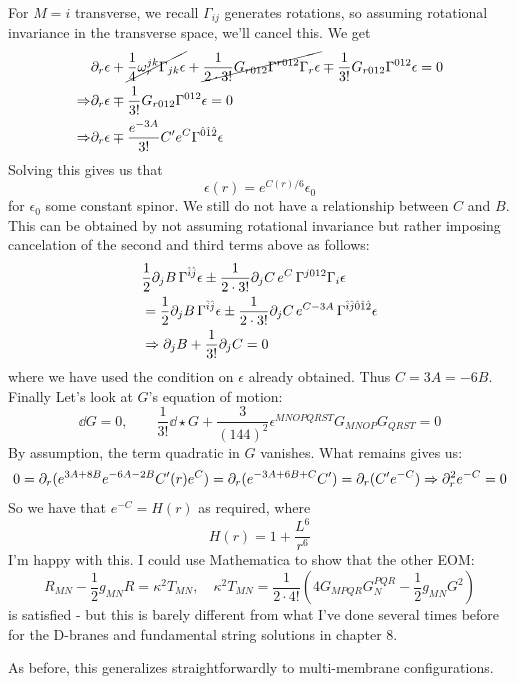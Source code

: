 \documentclass[11pt, class=article, crop=false]{standalone}
\begin{document}
\begin{enumerate}
	For $M = i$ transverse, we recall $\Gamma_{ij}$ generates rotations, so assuming rotational invariance in the transverse space, we'll cancel this. We get
	\[
	\begin{aligned}
		&\partial_r \epsilon + \cancel{\frac14 \omega_{r}^{jk} \Gamma_{jk} \epsilon} +\cancel{\frac{1}{2 \cdot 3!} G_{r012} \Gamma^{r 012} \Gamma_r \epsilon} \mp \frac{1}{3!} G_{r012} \Gamma^{012} \epsilon = 0\\
		\Rightarrow& \partial_r \epsilon \mp \frac{1}{3!} G_{r012} \Gamma^{012} \epsilon = 0\\
		\Rightarrow& \partial_r \epsilon \mp \frac{e^{-3A}}{3!} C' e^C \Gamma^{\hat 0 \hat 1 \hat 2} \epsilon
	\end{aligned}
	\]
	Solving this gives us that 
	\[
		\epsilon(r) = e^{C(r)/6} \epsilon_0
	\]
	for $\epsilon_0$ some constant spinor. We still do not have a relationship between $C$ and $B$. This can be obtained by not assuming rotational invariance but rather imposing cancelation of the second and third terms above as follows:
	\[
	\begin{aligned}
		&\frac12 \partial_j B \, \Gamma^{\hat i \hat j} \epsilon  \pm \frac{1}{2 \cdot 3!} \partial_j C \, e^{C} \, \Gamma^{j012} \Gamma_i \epsilon \\
		&= \frac12 \partial_j B \, \Gamma^{\hat i \hat j} \epsilon  \pm \frac{1}{2 \cdot 3!} \partial_j C \, e^{C-3A} \, \Gamma^{\hat i \hat j \hat 0 \hat 1 \hat 2} \epsilon\\
		& \Rightarrow  \partial_j B + \frac{1}{3!} \partial_j C = 0
	\end{aligned}
	\]
	where we have used the condition on $\epsilon$ already obtained. Thus $C = 3A = -6B$. Finally 
	Let's look at $G$'s equation of motion: 
	\[
		\dd G = 0, \qquad \frac{1}{3!} \dd \star G + \frac{3}{(144)^2} \epsilon^{MNOPQRST} G_{MNOP} G_{QRST} = 0
	\]
	By assumption, the term quadratic in $G$ vanishes. What remains gives us:
	\[
		0 = \partial_r (e^{3A+8B} e^{-6A - 2B}  C'(r) e^C) = \partial_r (e^{-3A + 6B + C} C') = \partial_r (C' e^{-C}) \Rightarrow \partial_r^2 e^{-C} = 0
	\]
	So we have that $e^{-C} = H(r)$ as required, where
	\[
		H(r) = 1 + \frac{L^6}{r^6}
	\]
	I'm happy with this. I could use Mathematica to show that the other EOM:
	\[
		R_{MN} - \frac12 g_{MN} R = \kappa^2 T_{MN}, \quad \kappa^2 T_{MN} = \frac{1}{2 \cdot 4!} \left(4 G_{M P Q R} G_{N}^{PQR} - \frac12 g_{MN} G^2\right)
	\]
	is satisfied - but this is barely different from what I've done several times before for the D-branes and fundamental string solutions in chapter 8. 
	
	As before, this generalizes straightforwardly to multi-membrane configurations. 
	

\end{enumerate}
\end{document}

